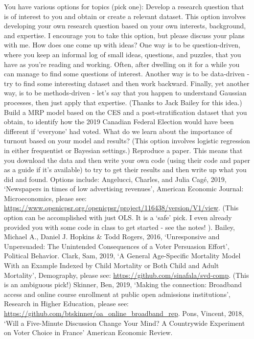 \documentclass[
]{book}
\begin{document}
You have various options for topics (pick one):
Develop a research question that is of interest to you and obtain or create a relevant dataset. This option involves developing your own research question based on your own interests, background, and expertise. I encourage you to take this option, but please discuss your plans with me. How does one come up with ideas? One way is to be question-driven, where you keep an informal log of small ideas, questions, and puzzles, that you have as you're reading and working. Often, after dwelling on it for a while you can manage to find some questions of interest. Another way is to be data-driven - try to find some interesting dataset and then work backward. Finally, yet another way, is to be methods-driven - let's say that you happen to understand Gaussian processes, then just apply that expertise.
(Thanks to Jack Bailey for this idea.) Build a MRP model based on the CES and a post-stratification dataset that you obtain, to identify how the 2019 Canadian Federal Election would have been different if `everyone' had voted. What do we learn about the importance of turnout based on your model and results? (This option involves logistic regression in either frequentist or Bayesian settings.)
Reproduce a paper. This means that you download the data and then write your own code (using their code and paper as a guide if it's available) to try to get their results and then write up what you did and found. Options include:
Angelucci, Charles, and Julia Cagé, 2019, `Newspapers in times of low advertising revenues', American Economic Journal: Microeconomics, please see: \url{https://www.openicpsr.org/openicpsr/project/116438/version/V1/view}. (This option can be accomplished with just OLS. It is a `safe' pick. I even already provided you with some code in class to get started - see the notes! ).
Bailey, Michael A., Daniel J. Hopkins \& Todd Rogers, 2016, `Unresponsive and Unpersuaded: The Unintended Consequences of a Voter Persuasion Effort', Political Behavior.
Clark, Sam, 2019, `A General Age-Specific Mortality Model With an Example Indexed by Child Mortality or Both Child and Adult Mortality', Demography, please see: \url{https://github.com/sinafala/svd-comp}. (This is an ambiguous pick!)
Skinner, Ben, 2019, `Making the connection: Broadband access and online course enrollment at public open admissions institutions', Research in Higher Education, please see: \url{https://github.com/btskinner/oa_online_broadband_rep}.
Pons, Vincent, 2018, `Will a Five-Minute Discussion Change Your Mind? A Countrywide Experiment on Voter Choice in France' American Economic Review.
\end{document}
